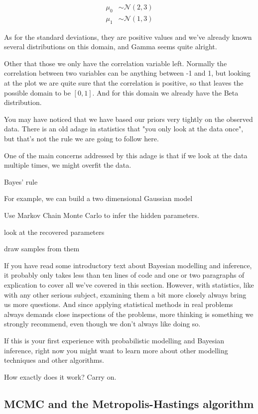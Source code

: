 \documentclass[11pt]{article}
\begin{document}
\begin{align*}
\mu_{0} &\sim \mathcal{N} (2, 3) \\
\mu_{1} &\sim \mathcal{N} (1, 3)
\end{align*}

As for the standard deviations, they are positive values and we've already known several distributions on this domain, and Gamma seems quite alright.

Other that those we only have the correlation variable left. Normally the correlation between two variables can be anything between -1 and 1, but looking at the plot we are quite sure that the correlation is positive, so that leaves the possible domain to be \([0, 1]\). And for this domain we already have the Beta distribution.

You may have noticed that we have based our priors very tightly on the observed data. There is an old adage in statistics that "you only look at the data once", but that's not the rule we are going to follow here.

One of the main concerns addressed by this adage is that if we look at the data multiple times, we might overfit the data.

Bayes' rule

For example, we can build a two dimensional Gaussian model

Use Markov Chain Monte Carlo to infer the hidden parameters.

look at the recovered parameters

draw samples from them

If you have read some introductory text about Bayesian modelling and inference, it probably only takes less than ten lines of code and one or two paragraphs of explication to cover all we've covered in this section. However, with statistics, like with any other serious subject, examining them a bit more closely always bring us more questions. And since applying statistical methods in real problems always demands close inspections of the problems, more thinking is something we strongly recommend, even though we don't always like doing so.

If this is your first experience with probabilistic modelling and
Bayesian inference, right now you might want to learn more about other
modelling techniques and other algorithms.

How exactly does it work? Carry on.

\subsection{MCMC and the Metropolis-Hastings algorithm}
\label{sec:org365524d}
\end{document}
